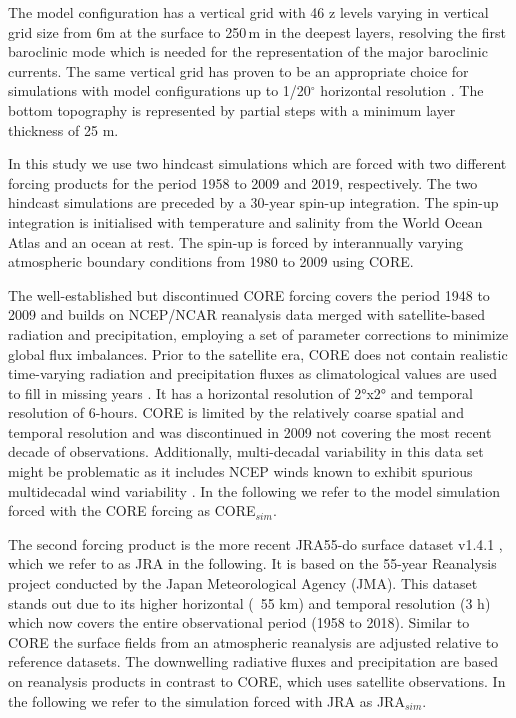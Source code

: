 \documentclass[os, manuscript]{copernicus}
\begin{document}
	The model configuration has a vertical grid with 46 z levels varying in vertical grid size from 6m at the surface to 250$\,$m in the deepest layers, resolving the first baroclinic mode \citep{Stewart2017,Schubert2019} which is needed for the representation of the major baroclinic currents. The same vertical grid has proven to be an appropriate choice for simulations with model configurations up to 1/20$^{\circ}$ horizontal resolution \cite[e.g.][]{Boning2016,Behrens2017}. The bottom topography is represented by partial steps \citep{Barnier2006} with a minimum layer thickness of 25 m.
	
	In this study we use two hindcast simulations which are forced with two different forcing products for the period 1958 to 2009 and 2019, respectively. The two hindcast simulations are preceded by a 30-year spin-up integration. The spin-up integration is initialised with temperature and salinity from the World Ocean Atlas \cite[][with modifications in the polar regions from PHC; \citealp{Steele2001}]{Levitus1998} and an ocean at rest. The spin-up is forced by interannually varying atmospheric boundary conditions from 1980 to 2009 using CORE. 
	
	The well-established but discontinued CORE forcing covers the period 1948 to 2009 \citep{Griffies2009} and builds on NCEP/NCAR reanalysis data merged with satellite-based radiation and precipitation, employing a set of parameter corrections to minimize global flux imbalances. Prior to the satellite era, CORE does not contain realistic time-varying radiation and precipitation fluxes as climatological values are used to fill in missing years \citep{Large2009}. It has a horizontal resolution of 2°x2° and temporal resolution of 6-hours. CORE is limited by the relatively coarse spatial and temporal resolution and was discontinued  in 2009 not covering the most recent decade of observations. Additionally, multi-decadal variability in this data set might be problematic as it includes NCEP winds known to exhibit spurious multidecadal wind variability \citep{Fiorino,He2016,Hurrell1998}. In the following we  refer to the model simulation forced with the CORE forcing as CORE$ _{sim} $.
	
	The second forcing product is the more recent JRA55-do surface dataset v1.4.1 \citep{Tsujino2018}, which we  refer to as JRA in the following. It is based on the 55-year Reanalysis project \cite[JRA-55; e.g.][]{Kobayashi2015} conducted by the Japan Meteorological Agency (JMA). This dataset stands out due to its higher horizontal (~55 km) and temporal resolution (3 h) which now covers the entire observational period (1958 to 2018). Similar to CORE the surface fields from an atmospheric reanalysis are adjusted relative to reference datasets. The downwelling radiative fluxes and precipitation are based on reanalysis products in contrast to CORE, which uses satellite observations. In the following we  refer to the simulation forced with JRA as JRA$ _{sim} $.
	
\end{document}

